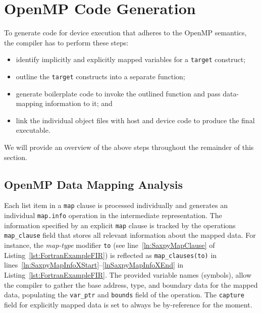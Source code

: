 \documentclass[acmtog,natbib=false]{acmart}
\newcommand{\code}[1]{\texttt{#1}\xspace}
\begin{document}

\section{OpenMP Code Generation}
\label{sec:OpenMPCodeGen}

To generate code for device execution that adheres to the OpenMP semantics, the compiler has to perform these steps:

\begin{itemize}
\item identify implicitly and explicitly mapped variables for a \code{target} construct;
\item outline the \code{target} constructs into a separate function;
\item generate boilerplate code to invoke the outlined function and pass data-mapping information to it; and
\item link the individual object files with host and device code to produce the final executable.
\end{itemize}

We will provide an overview of the above steps throughout the remainder of this section.

\subsection{OpenMP Data Mapping Analysis}
\label{sec:OpenMPDataMappingAnalysis}

Each list item in a \code{map} clause is processed individually and generates an individual \code{map.info} operation in the intermediate representation. 
The information specified by an explicit \code{map} clause is tracked by the operations \code{map\_clause} field that stores all relevant information about the mapped data. 
For instance, the \textit{map-type} modifier \code{to} (see line~\ref{ln:SaxpyMapClause} of Listing~\ref{lst:FortranExampleFIR}) is reflected as \code{map\_clauses(to)} in lines~\ref{ln:SaxpyMapInfoXStart}--\ref{lnSaxpyMapInfoXEnd} in Listing~\ref{lst:FortranExampleFIR}. 
The provided variable names (symbols), allow the compiler to gather the base address, type, and boundary data for the mapped data, populating the \code{var\_ptr} and \code{bounds} field of the operation. 
The \code{capture} field for explicitly mapped data is set to always be by-reference for the moment.
\end{document}
